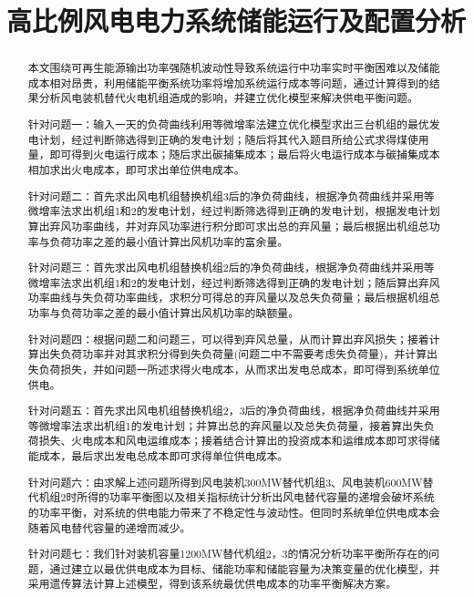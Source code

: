 \documentclass{cumcmthesis}
\title{高比例风电电力系统储能运行及配置分析}
\begin{document}
	\setcounter{page}{2}
 \begin{abstract}
 	本文围绕可再生能源输出功率强随机波动性导致系统运行中功率实时平衡困难以及储能成本相对昂贵，利用储能平衡系统功率将增加系统运行成本等问题，通过计算得到的结果分析风电装机替代火电机组造成的影响，并建立优化模型来解决供电平衡问题。
 	
 	针对问题一：输入一天的负荷曲线利用等微增率法建立优化模型求出三台机组的最优发电计划，经过判断筛选得到正确的发电计划；随后将其代入题目所给公式求得煤使用量，即可得到火电运行成本；随后求出碳捕集成本；最后将火电运行成本与碳捕集成本相加求出火电成本，即可求出单位供电成本。
 	
 	针对问题二：首先求出风电机组替换机组3后的净负荷曲线，根据净负荷曲线并采用等微增率法求出机组1和2的发电计划，经过判断筛选得到正确的发电计划，根据发电计划算出弃风功率曲线，并对弃风功率进行积分即可求出总的弃风量；最后根据出机组总功率与负荷功率之差的最小值计算出风机功率的富余量。
 	
 	针对问题三：首先求出风电机组替换机组2后的净负荷曲线，根据净负荷曲线并采用等微增率法求出机组1和2的发电计划，经过判断筛选得到正确的发电计划；随后算出弃风功率曲线与失负荷功率曲线，求积分可得总的弃风量以及总失负荷量；最后根据机组总功率与负荷功率之差的最小值计算出风机功率的缺额量。
 	
 	针对问题四：根据问题二和问题三，可以得到弃风总量，从而计算出弃风损失；接着计算出失负荷功率并对其求积分得到失负荷量(问题二中不需要考虑失负荷量)，并计算出失负荷损失，并如问题一所述求得火电成本，从而求出发电总成本，即可得到系统单位供电。
 	
 	针对问题五：首先求出风电机组替换机组2，3后的净负荷曲线，根据净负荷曲线并采用等微增率法求出机组1的发电计划；并算出总的弃风量以及总失负荷量，接着算出失负荷损失、火电成本和风电运维成本；接着结合计算出的投资成本和运维成本即可求得储能成本，最后求出发电总成本即可求得单位供电成本。
 	
 	针对问题六：由求解上述问题所得到风电装机300MW替代机组3、风电装机600MW替代机组2时所得的功率平衡图以及相关指标统计分析出风电替代容量的递增会破坏系统的功率平衡，对系统的供电能力带来了不稳定性与波动性。但同时系统单位供电成本会随着风电替代容量的递增而减少。
 	
 	针对问题七：我们针对装机容量1200MW替代机组2，3的情况分析功率平衡所存在的问题，通过建立以最优供电成本为目标、储能功率和储能容量为决策变量的优化模型，并采用遗传算法计算上述模型，得到该系统最优供电成本的功率平衡解决方案。


\end{abstract}
\pagestyle{plain}
\fancyfoot[C]{\thepage}
\end{document}
